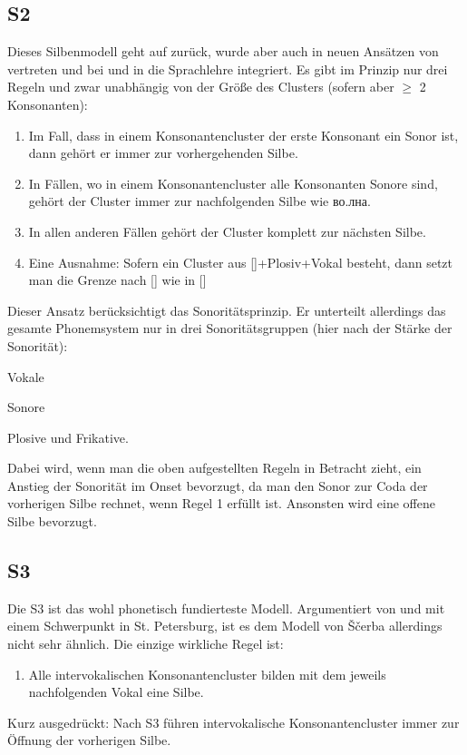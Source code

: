 \documentclass[12pt,headsepline,a4paper]{scrartcl}
\newcommand\textcyr[1]{{\fontencoding{OT2}\fontfamily{wncyr}\selectfont #1}}
\begin{document}
\subsection{S2}
Dieses Silbenmodell geht auf \textcite{avan1956} zurück, wurde aber auch in neuen Ansätzen von \textcite{kasatkin2001} vertreten und bei \textcite{wade1993} und \textcite{bolla1968} in die Sprachlehre integriert.
Es gibt im Prinzip nur drei Regeln und zwar unabhängig von der Größe des Clusters (sofern aber $\geq$ 2 Konsonanten):
\begin{enumerate}
  \item Im Fall, dass in einem Konsonantencluster der erste Konsonant ein Sonor ist, dann gehört er immer zur vorhergehenden Silbe.
  \item In Fällen, wo in einem Konsonantencluster alle Konsonanten Sonore sind, gehört der Cluster immer zur nachfolgenden Silbe wie \textcyr{во.лна}.
  \item In allen anderen Fällen gehört der Cluster komplett zur nächsten Silbe.
  \item Eine Ausnahme: Sofern ein Cluster aus []+Plosiv+Vokal besteht, dann setzt man die Grenze nach [] wie in []
\end{enumerate}
Dieser Ansatz berücksichtigt das Sonoritätsprinzip. Er unterteilt allerdings das gesamte Phonemsystem nur in drei Sonoritätsgruppen (hier nach der Stärke der Sonorität):
\begin{inparaenum}[(1)]
\item Vokale
\item Sonore
\item Plosive und Frikative.
\end{inparaenum}
Dabei wird, wenn man die oben aufgestellten Regeln in Betracht zieht, ein Anstieg der Sonorität im Onset bevorzugt, da man den Sonor zur Coda der vorherigen Silbe rechnet, wenn Regel 1 erfüllt ist. Ansonsten wird eine offene Silbe bevorzugt.

\subsection{S3}
Die S3 ist das wohl phonetisch fundierteste Modell. Argumentiert von \textcite{bondarko1998} und mit einem Schwerpunkt in St. Petersburg, ist es dem Modell von Ščerba allerdings nicht sehr ähnlich. Die einzige wirkliche Regel ist:
\begin{enumerate}
  \item Alle intervokalischen Konsonantencluster bilden mit dem jeweils nachfolgenden Vokal eine Silbe.
\end{enumerate}
Kurz ausgedrückt: Nach S3 führen intervokalische Konsonantencluster immer zur Öffnung der vorherigen Silbe. 
\end{document}
